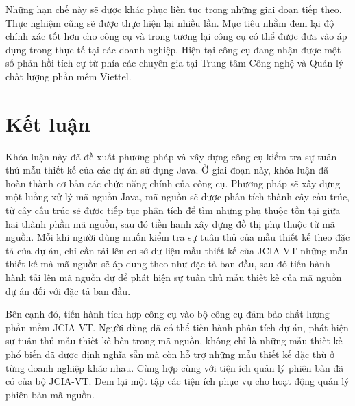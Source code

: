 \documentclass[12pt]{report}
\begin{document}
\noindent Những hạn chế này sẽ được khác phục liên tục trong những giai đoạn tiếp theo. Thực nghiệm cũng sẽ được thực hiện lại nhiều lần. Mục tiêu nhằm đem lại độ chính xác tốt hơn cho công cụ và trong tương lại công cụ có thể được đưa vào áp dụng trong thực tế tại các doanh nghiệp. Hiện tại công cụ đang nhận được một số phản hồi tích cự từ phía các chuyên gia tại Trung tâm Công nghệ và Quản lý chất lượng phần mềm Viettel.

\chapter{Kết luận}
Khóa luận này đã đề xuất phương pháp và xây dựng công cụ kiểm tra sự tuân thủ mẫu thiết kế của các dự án sử dụng Java. Ở giai đoạn này, khóa luận đã hoàn thành cơ bản các chức năng chính của công cụ. Phương pháp sẽ xây dựng một luồng xử lý mã nguồn Java, mã nguồn sẽ được phân tích thành cây cấu trúc, từ cây cấu trúc sẽ được tiếp tục phân tích để tìm những phụ thuộc tồn tại giữa hai thành phần mã nguồn, sau đó tiền hanh xây dựng đồ thị phụ thuộc từ mã nguồn. Mỗi khi người dùng muốn kiểm tra sự tuân thủ của mẫu thiết kế theo đặc tả của dự án, chỉ cần tải lên cơ sở dư liệu mẫu thiết kế của JCIA-VT những mẫu thiết kế mà mã nguồn sẽ áp dung theo như đặc tả ban đầu, sau đó tiến hành hành tải lên mã nguồn dự để phát hiện sự tuân thủ mẫu thiết kế của mã nguồn dự án đối với đặc tả ban đầu.

\noindent Bên cạnh đó, tiến hành tích hợp công cụ vào bộ công cụ đảm bảo chất lượng phần mềm JCIA-VT. Người dùng đã có thể tiến hành phân tích dự án, phát hiện sự tuân thủ mẫu thiết kê bên trong mã nguồn, không chỉ là những mẫu thiết kế phổ biến đã được định nghĩa sẵn mà còn hỗ trợ những mẫu thiết kế đặc thù ở từng doanh nghiệp khác nhau. Cùng hợp cùng với tiện ích quản lý phiên bản đã có của bộ JCIA-VT. Đem lại một tập các tiện ích phục vụ cho hoạt động quản lý phiên bản mã nguồn.
\end{document}
